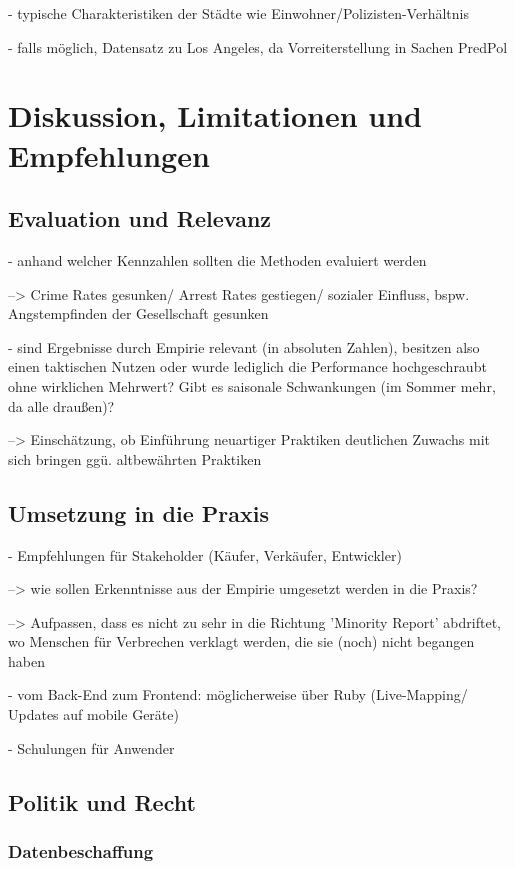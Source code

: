 \documentclass[a4paper,12pt,parskip,bibtotoc,liststotoc]{article}
\begin{document}
- typische Charakteristiken der Städte wie Einwohner/Polizisten-Verhältnis

- falls möglich, Datensatz zu Los Angeles, da Vorreiterstellung in Sachen PredPol


\newpage
\section{Diskussion, Limitationen und Empfehlungen}

\subsection{Evaluation und Relevanz}

- anhand welcher Kennzahlen sollten die Methoden evaluiert werden

--> Crime Rates gesunken/ Arrest Rates gestiegen/ sozialer Einfluss, bspw. Angstempfinden der Gesellschaft gesunken

- sind Ergebnisse durch Empirie relevant (in absoluten Zahlen), besitzen also einen taktischen Nutzen oder wurde lediglich die Performance hochgeschraubt ohne wirklichen Mehrwert? Gibt es saisonale Schwankungen (im Sommer mehr, da alle draußen)?

--> Einschätzung, ob Einführung neuartiger Praktiken deutlichen Zuwachs mit sich bringen ggü. altbewährten Praktiken



\subsection{Umsetzung in die Praxis}
- Empfehlungen für Stakeholder (Käufer, Verkäufer, Entwickler) 

--> wie sollen Erkenntnisse aus der Empirie umgesetzt werden in die Praxis? 

--> Aufpassen, dass es nicht zu sehr in die Richtung 'Minority Report' abdriftet, wo Menschen für Verbrechen verklagt werden, die sie (noch) nicht begangen haben

- vom Back-End zum Frontend: möglicherweise über Ruby (Live-Mapping/ Updates auf mobile Geräte)

- Schulungen für Anwender


\subsection{Politik und Recht}

\subsubsection{Datenbeschaffung}
\end{document}
